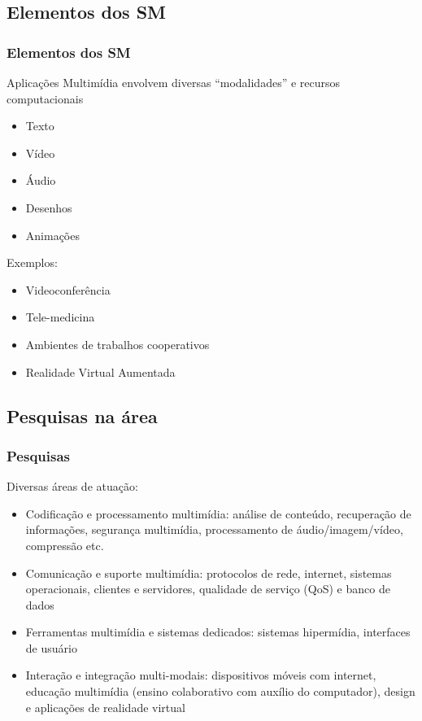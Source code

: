 \documentclass[xcolor]{beamer}
\begin{document}
\subsection{Elementos dos SM}
\begin{frame}
    \frametitle{Elementos dos SM}
    
    Aplicações Multimídia envolvem diversas ``modalidades'' e recursos
computacionais

    \begin{itemize}
        \item Texto
        \item Vídeo
        \item Áudio
        \item Desenhos
        \item Animações
    \end{itemize}

    Exemplos:

    \begin{itemize}
        \item Videoconferência
        \item Tele-medicina
        \item Ambientes de trabalhos cooperativos
        \item Realidade Virtual Aumentada
    \end{itemize}
\end{frame}

\subsection{Pesquisas na área}
\begin{frame}
    \frametitle{Pesquisas}

    Diversas áreas de atuação:

    \begin{itemize}
        \item \alert{Codificação e processamento multimídia}: análise de
conteúdo, recuperação de informações, segurança multimídia, processamento de
áudio/imagem/vídeo, compressão etc.
        \item \alert{Comunicação e suporte multimídia}: protocolos de rede,
internet, sistemas operacionais, clientes e servidores, qualidade de serviço
(QoS) e banco de dados
        \item \alert{Ferramentas multimídia e sistemas dedicados}: sistemas
hipermídia, interfaces de usuário
        \item \alert{Interação e integração multi-modais}: dispositivos móveis
com internet, educação multimídia (ensino colaborativo com auxílio do
computador), design e aplicações de realidade virtual
    \end{itemize}
\end{frame}
\end{document}
